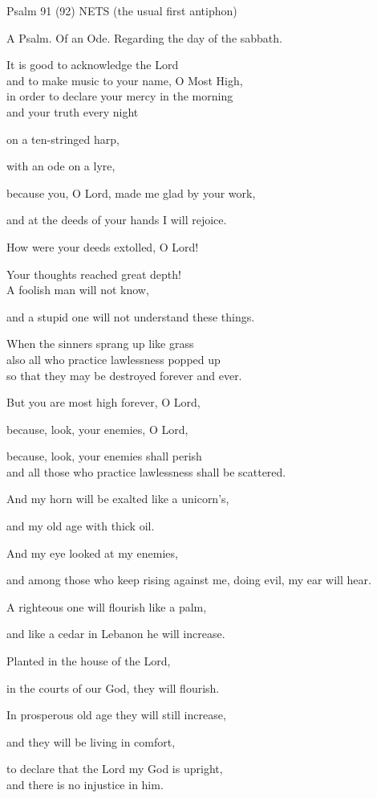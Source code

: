 \documentclass[
]{article}
\newcommand{\RL}[1]{\beginR #1\endR}
\begin{document}
Psalm 91 (92) NETS (the usual first antiphon)

A Psalm. Of an Ode. Regarding the day of the sabbath.

It is good to acknowledge the Lord\\
and to make music to your name, O Most High,\\
in order to declare your mercy in the morning\\
and your truth every night

on a ten-stringed harp,

with an ode on a lyre,

because you, O Lord, made me glad by your work,

and at the deeds of your hands I will rejoice.

How were your deeds extolled, O Lord!

Your thoughts reached great depth!\\
A foolish man will not know,

and a stupid one will not understand these things.

When the sinners sprang up like grass\\
also all who practice lawlessness popped up\\
so that they may be destroyed forever and ever.

But you are most high forever, O Lord,

because, look, your enemies, O Lord,

because, look, your enemies shall perish\\
and all those who practice lawlessness shall be scattered.

And my horn will be exalted like a unicorn\RL{'}s,

and my old age with thick oil.

And my eye looked at my enemies,

and among those who keep rising against me, doing evil, my ear will
hear.

A righteous one will flourish like a palm,

and like a cedar in Lebanon he will increase.

Planted in the house of the Lord,

in the courts of our God, they will flourish.

In prosperous old age they will still increase,

and they will be living in comfort,

to declare that the Lord my God is upright,\\
and there is no injustice in him.
\end{document}
